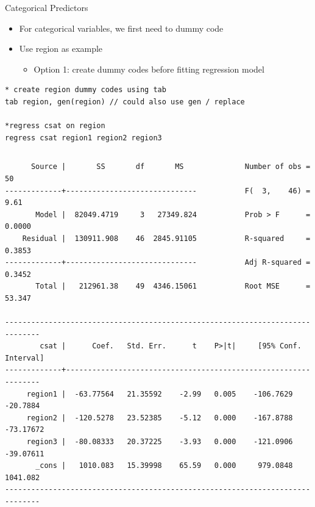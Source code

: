 \documentclass[table,smaller]{beamer}
\begin{document}
\begin{frame}[fragile,label=sec-4-3]{Categorical Predictors}
 \begin{itemize}
\item For categorical variables, we first need to dummy code
\item Use region as example
\begin{itemize}
\item Option 1: create dummy codes before fitting regression model
\end{itemize}
\end{itemize}


\begin{verbatim}
* create region dummy codes using tab 
tab region, gen(region) // could also use gen / replace

*regress csat on region
regress csat region1 region2 region3
\end{verbatim}


\vspace{-.5em}
\begin{columns}
\begin{block}{}
\begin{verbatim}
      Source |       SS       df       MS              Number of obs =      50
-------------+------------------------------           F(  3,    46) =    9.61
       Model |  82049.4719     3   27349.824           Prob > F      =  0.0000
    Residual |  130911.908    46  2845.91105           R-squared     =  0.3853
-------------+------------------------------           Adj R-squared =  0.3452
       Total |   212961.38    49  4346.15061           Root MSE      =  53.347

------------------------------------------------------------------------------
        csat |      Coef.   Std. Err.      t    P>|t|     [95% Conf. Interval]
-------------+----------------------------------------------------------------
     region1 |  -63.77564   21.35592    -2.99   0.005    -106.7629    -20.7884
     region2 |  -120.5278   23.52385    -5.12   0.000    -167.8788   -73.17672
     region3 |  -80.08333   20.37225    -3.93   0.000    -121.0906   -39.07611
       _cons |   1010.083   15.39998    65.59   0.000     979.0848    1041.082
------------------------------------------------------------------------------
\end{verbatim}
\end{block}
\end{columns}
\vspace{.5em}
\end{frame}
\end{document}
